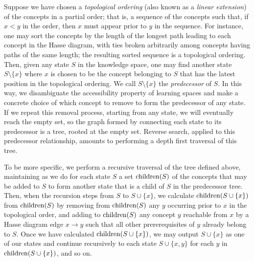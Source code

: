 \documentclass[11pt]{llncs}
\begin{document}
{Suppose we have chosen a \emph{topological ordering} (also known as a \emph{linear extension}) of the concepts in a partial order; that is,
a sequence of the concepts such that, if $x<y$ in the order, then $x$ must appear prior to $y$ in the sequence. For instance, one may sort the concepts by the length of the longest path leading to each concept in the Hasse diagram, with ties broken arbitrarily among concepts having paths of the same length; the resulting sorted sequence is a topological ordering.
Then, given any state $S$ in the knowledge space, one may find another state $S\setminus\{x\}$ where $x$ is chosen to be the concept belonging to $S$ that has the latest position in the topological ordering. We call $S\setminus\{x\}$ the \emph{predecessor} of $S$. In this way, we disambiguate the accessibility property of learning spaces and make a concrete choice of which concept to remove to form the predecessor of any state.
If we repeat this removal process, starting from any state, we will eventually reach the empty set, so the graph formed by connecting each state to its predecessor is a tree, rooted at the empty set.
Reverse search, applied to this predecessor relationship, amounts to performing a depth first traversal of this tree.

To be more specific, we perform a recursive traversal of the tree defined above, maintaining as we do for each state $S$ a set ${\rm children}(S)$ of the concepts that may be added to $S$ to form another state that is a child of $S$ in the predecessor tree. Then, when the recursion steps from $S$ to $S\cup\{x\}$, we calculate ${\rm children}(S\cup\{x\})$ from  ${\rm children}(S)$ by removing from ${\rm children}(S)$ any $y$ occurring prior to $x$ in the topological order, and adding to ${\rm children}(S)$ any concept $y$ reachable from $x$ by a Hasse diagram edge $x\rightarrow y$ such that all other prererequisites of $y$ already belong to $S$.
Once we have calculated ${\rm children}(S\cup\{x\})$, we may output $S\cup\{x\}$ as one of our states and continue recursively to each state $S\cup\{x,y\}$ for each $y$ in ${\rm children}(S\cup\{x\})$, and so on.

}
\end{document}
